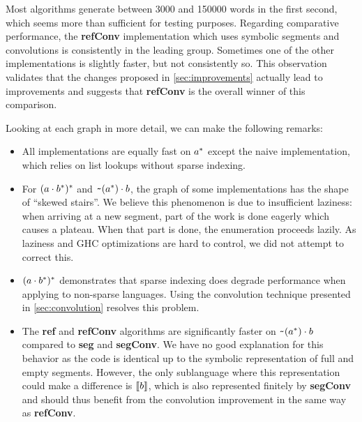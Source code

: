 Most algorithms generate between 3000 and 150000 words in the first
second, which seems more than sufficient for testing purposes.
Regarding comparative performance, the \textbf{refConv} implementation
which uses symbolic segments and convolutions is consistently in the
leading group. Sometimes one of the other implementations is slightly
faster, but not consistently so. This observation validates that the
changes proposed in \cref{sec:improvements} actually lead to
improvements and suggests that \textbf{refConv} is the overall winner
of this comparison.

Looking at each graph in more detail, we can make the following
remarks:
\begin{itemize}[leftmargin=*]
\item All implementations are equally fast on $a^*$ except
  the naive implementation, which  relies on list lookups without
  sparse indexing.
\item For $(a \cdot{b^*})^*$ and
  $\texttt{\textasciitilde}{(a^*)} \cdot{b}$, the graph of some implementations
  has the shape of ``skewed stairs''. We believe this phenomenon is due to
  insufficient laziness: when arriving at a new segment, part of the
  work is done eagerly which causes a plateau. When that part is done,
  the enumeration proceeds lazily.  As laziness and GHC
  optimizations are hard to control, we did not attempt to correct this.
\item $(a \cdot{b^*})^*$ demonstrates that sparse indexing
  does degrade performance when applying  to non-sparse languages.
  Using the convolution technique presented in \cref{sec:convolution} resolves this problem.
\item The \textbf{ref} and \textbf{refConv} algorithms are
  significantly faster on $\texttt{\textasciitilde}{(a^*)} \cdot{b}$
  compared to \textbf{seg} and \textbf{segConv}. We have no good
  explanation for this behavior as the code is identical up to the
  symbolic representation of full and empty segments. However, the
  only sublanguage where this representation could make a difference
  is $\llbracket b\rrbracket$, which is also represented finitely by
  \textbf{segConv} and should thus benefit from the convolution
  improvement in the same way as \textbf{refConv}.
\end{itemize}


